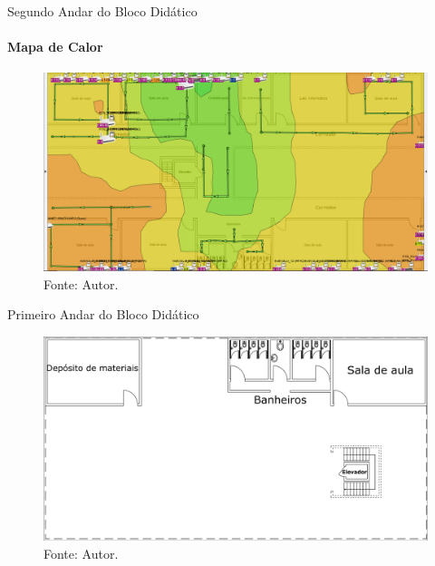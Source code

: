 \documentclass[aspectratio=169,12pt]{beamer}
\begin{document}
\begin{frame}{Segundo Andar do Bloco Didático}
	\framesubtitle{Mapa de Calor}
	\vspace*{-3mm}
	\begin{figure}[H]
		\centering
		\caption*{{\fontsize{9pt}{11}\selectfont Mapa de calor do 2º andar.}}
		\includegraphics[scale=0.28]{fig_tcc/heatmapper_2_andar.png}
		\caption*{{\fontsize{8pt}{11}\selectfont Fonte: Autor.}}
	\end{figure}
\end{frame}
\begin{frame}{Primeiro Andar do Bloco Didático}
	\vspace*{-3mm}
		\begin{figure}[H]
		\centering
		\caption*{{\fontsize{9pt}{11}\selectfont Planta Baixa do 1º andar.}}
		\includegraphics[scale=0.16]{fig_tcc/planta_andar1.pdf}
		\caption*{{\fontsize{9pt}{11}\selectfont Fonte: Autor.}}
	\end{figure}
\end{frame}
\end{document}
